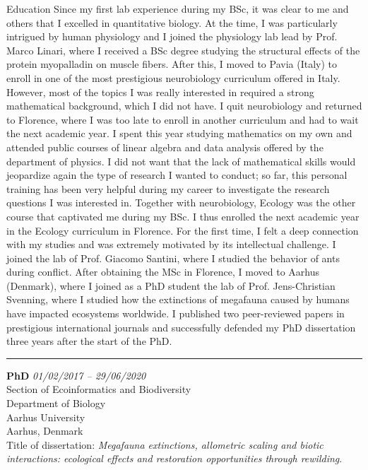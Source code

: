 \documentclass{resume} %
\newcommand{\spazio}{\begin{center} \par\noindent\rule{0.2\textwidth}{0.4pt} \end{center}}
\begin{document}
\begin{rSection}{Education}
Since my first lab experience during my BSc, it was clear to me and others that I excelled in quantitative biology.
At the time, I was particularly intrigued by human physiology and I joined the physiology lab lead by Prof. Marco Linari, where I received a BSc degree studying the structural effects of the protein myopalladin on muscle fibers.
After this, I moved to Pavia (Italy) to enroll in one of the most prestigious neurobiology curriculum offered in Italy.
However, most of the topics I was really interested in required a strong mathematical background, which I did not have.
I quit neurobiology and returned to Florence, where I was too late to enroll in another curriculum and had to wait the next academic year.
I spent this year studying mathematics on my own and attended public courses of linear algebra and data analysis offered by the department of physics.
I did not want that the lack of mathematical skills would jeopardize again the type of research I wanted to conduct; so far, this personal training has been very helpful during my career to investigate the research questions I was interested in. Together with neurobiology, Ecology was the other course that captivated me during my BSc.
I thus enrolled the next academic year in the Ecology curriculum in Florence.
For the first time, I felt a deep connection with my studies and was extremely motivated by its intellectual challenge.
I joined the lab of Prof. Giacomo Santini, where I studied the behavior of ants during conflict.
After obtaining the MSc in Florence, I moved to Aarhus (Denmark), where I joined as a PhD student the lab of Prof. Jens-Christian Svenning, where I studied how the extinctions of megafauna caused by humans have impacted ecosystems worldwide. 
I published two peer-reviewed papers in prestigious international journals and successfully defended my PhD dissertation three years after the start of the PhD.

\spazio

{\bf PhD} \hfill {\em 01/02/2017 -- 29/06/2020} 
\\ Section of Ecoinformatics and Biodiversity
\\ Department of Biology
\\ Aarhus University
\\ Aarhus, Denmark
\\ Title of dissertation: \textit{Megafauna extinctions, allometric scaling and biotic interactions: ecological effects and restoration opportunities through rewilding}.


\end{rSection}
\end{document}
